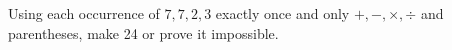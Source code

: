Using each occurrence of $7,7,2,3$ exactly once and only $+,-,\times,\div$ and parentheses, make 24 or prove it impossible.
